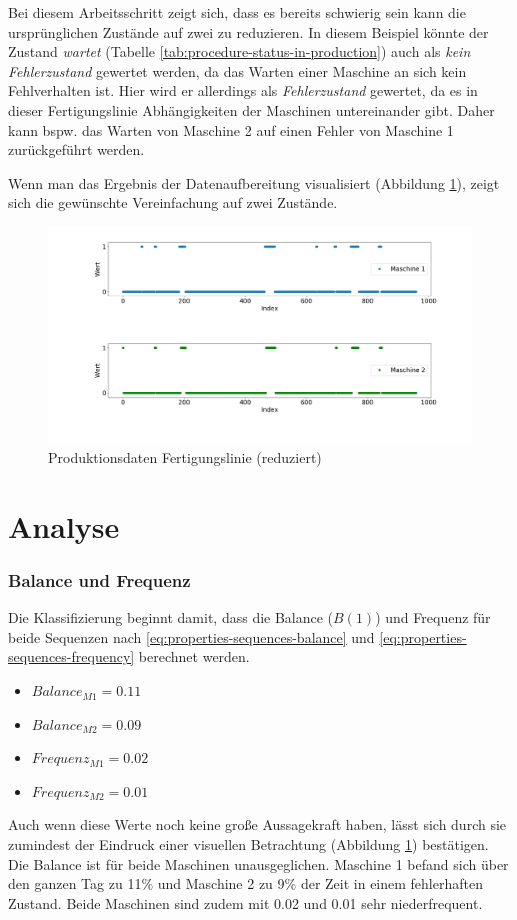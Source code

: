 Bei diesem Arbeitsschritt zeigt sich, dass es bereits schwierig sein kann die ursprünglichen Zustände auf zwei zu reduzieren. In diesem Beispiel könnte der Zustand \textit{wartet} (Tabelle \ref{tab:procedure-status-in-production}) auch als \textit{kein Fehlerzustand} gewertet werden, da das Warten einer Maschine an sich kein Fehlverhalten ist. Hier wird er allerdings als \textit{Fehlerzustand} gewertet, da es in dieser Fertigungslinie Abhängigkeiten der Maschinen untereinander gibt. Daher kann bspw. das Warten von Maschine 2 auf einen Fehler von  Maschine 1 zurückgeführt werden.

Wenn man das Ergebnis der Datenaufbereitung visualisiert (Abbildung \ref{fig:procedure-reduced-data}), zeigt sich die gewünschte Vereinfachung auf zwei Zustände.

\begin{figure}[H]
	\centering
	\includegraphics[scale=0.32]{images/procedure/reduced-data}
	\caption{Produktionsdaten Fertigungslinie (reduziert)}
	\label{fig:procedure-reduced-data}
\end{figure}

\section{Analyse}

\subsubsection{Balance und Frequenz}

Die Klassifizierung beginnt damit, dass die Balance ($B(1)$) und Frequenz für beide Sequenzen nach \ref{eq:properties-sequences-balance} und \ref{eq:properties-sequences-frequency} berechnet werden.
\begin{itemize}
	\item $Balance_{M1} = 0.11$
	\item $Balance_{M2} = 0.09$
	\item $Frequenz_{M1} = 0.02$
	\item $Frequenz_{M2} = 0.01$
\end{itemize}
Auch wenn diese Werte noch keine große Aussagekraft haben, lässt sich durch sie zumindest der Eindruck einer visuellen Betrachtung (Abbildung \ref{fig:procedure-reduced-data}) bestätigen. Die Balance ist für beide Maschinen unausgeglichen. Maschine 1 befand sich über den ganzen Tag zu 11\% und Maschine 2 zu 9\% der Zeit in einem fehlerhaften Zustand. Beide Maschinen sind zudem mit 0.02 und 0.01 sehr niederfrequent.

